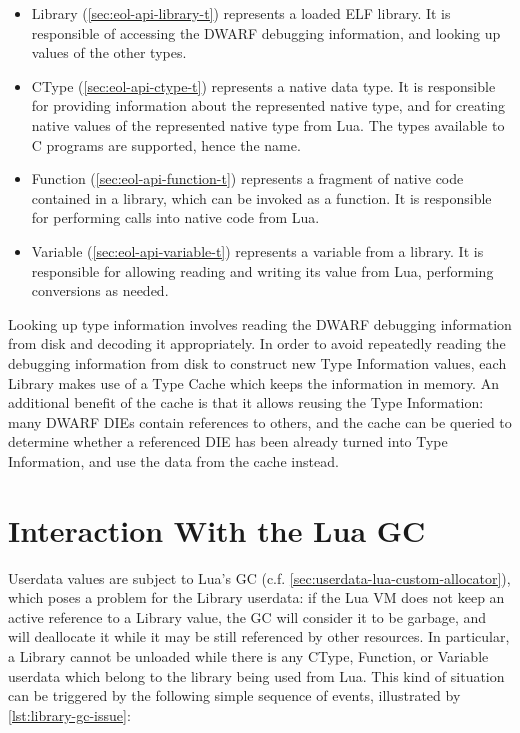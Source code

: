 \begin{itemize}

	\item \textsf{Library} (\autoref{sec:eol-api-library-t}) represents a loaded
	ELF library. It is responsible of accessing the DWARF debugging information,
	and looking up values of the other types.

	\item \textsf{CType} (\autoref{sec:eol-api-ctype-t}) represents a native
	data type. It is responsible for providing information about the represented
	native type, and for creating native values of the represented native type
	from Lua. The types available to C programs are supported, hence the name.

	\item \textsf{Function} (\autoref{sec:eol-api-function-t}) represents a
		fragment of native code contained in a library, which can be invoked as
		a function. It is responsible for performing calls into native code
		from Lua.

	\item \textsf{Variable} (\autoref{sec:eol-api-variable-t}) represents a
		variable from a library. It is responsible for allowing reading and
		writing its value from Lua, performing conversions as needed.

\end{itemize}

Looking up type information involves reading the DWARF debugging information
from disk and decoding it appropriately. In order to avoid repeatedly reading
the debugging information from disk to construct new \textsf{Type Information}
values, each \textsf{Library} makes use of a \textsf{Type Cache} which keeps
the information in memory. An additional benefit of the cache is that it
allows reusing the \textsf{Type Information}: many DWARF \gls{DIE}s contain
references to others, and the
cache can be queried to determine whether a referenced DIE has been already
turned into \textsf{Type Information}, and use the data from the cache
instead.


\section{Interaction With the Lua GC}
	\label{sec:design-gc-interaction}

Userdata values are subject to Lua's \gls{GC} (c.f.
\autoref{sec:userdata-lua-custom-allocator}), which poses a problem for the
\textsf{Library} userdata: if the Lua VM does not keep an active reference to
a \textsf{Library} value, the GC will consider it to be garbage, and will
deallocate it while it may be still referenced by other resources. In
particular, a \textsf{Library} cannot be unloaded while there is any
\textsf{CType}, \textsf{Function}, or \textsf{Variable} userdata which belong
to the library being used from Lua. This kind of situation can be triggered by
the following simple sequence of events, illustrated by
\autoref{lst:library-gc-issue}:

